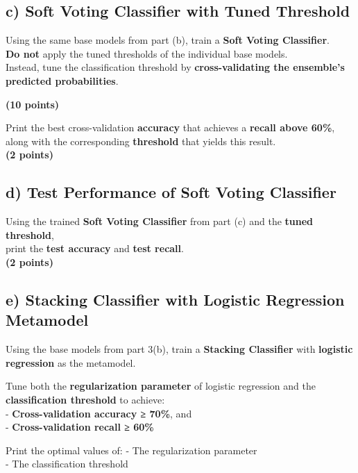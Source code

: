 \documentclass[
  letterpaper,
  DIV=11,
  numbers=noendperiod]{scrreprt}
\begin{document}
\subsection{c) Soft Voting Classifier with Tuned
Threshold}\label{c-soft-voting-classifier-with-tuned-threshold}

Using the same base models from part (b), train a \textbf{Soft Voting
Classifier}.\\
\textbf{Do not} apply the tuned thresholds of the individual base
models.\\
Instead, tune the classification threshold by \textbf{cross-validating
the ensemble's predicted probabilities}.

\textbf{(10 points)}

Print the best cross-validation \textbf{accuracy} that achieves a
\textbf{recall above 60\%}, along with the corresponding
\textbf{threshold} that yields this result.\\
\textbf{(2 points)}

\subsection{d) Test Performance of Soft Voting
Classifier}\label{d-test-performance-of-soft-voting-classifier}

Using the trained \textbf{Soft Voting Classifier} from part (c) and the
\textbf{tuned threshold},\\
print the \textbf{test accuracy} and \textbf{test recall}.\\
\textbf{(2 points)}

\subsection{e) Stacking Classifier with Logistic Regression
Metamodel}\label{e-stacking-classifier-with-logistic-regression-metamodel}

Using the base models from part 3(b), train a \textbf{Stacking
Classifier} with \textbf{logistic regression} as the metamodel.

Tune both the \textbf{regularization parameter} of logistic regression
and the \textbf{classification threshold} to achieve:\\
- \textbf{Cross-validation accuracy ≥ 70\%}, and\\
- \textbf{Cross-validation recall ≥ 60\%}

Print the optimal values of: - The regularization parameter\\
- The classification threshold
\end{document}
